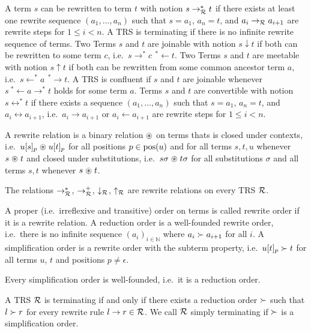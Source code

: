 \begin{definition}
	A term $s$ can be rewritten to term $t$ with notion $s\rightarrow^*_{\mathcal R} t$ 
	if there exists at least one {\myem rewrite sequence} $(a_1,\ldots ,a_n)$ such that
	$s=a_1$, $a_n=t$, and $a_i\rightarrow_{\mathcal R} a_{i+1}$ are rewrite steps for $1\leq i<n$.
	A TRS is {\myem terminating} if there is no infinite rewrite sequence of terms.
	Two Terms $s$ and $t$ are {\myem joinable} with notion $s\downarrow t$ 
	if both can be rewritten to some term $c$, i.e.~$s \rightarrow^*c\ \, ^*\!\!\leftarrow t$.
%	
	Two Terms $s$ and $t$ are {\myem meetable} with notion $s\uparrow t$ 
	if both can be rewritten from some common ancestor term $a$, i.e.~$s \leftarrow^*a\ \, ^*\!\!\rightarrow t$.
%
	A TRS is {\myem confluent } if $s$ and $t$ are joinable whenever $s\ ^*\!\!\leftarrow a \rightarrow^* t$ holds for some term $a$.
	Terms $s$ and $t$ are {\myem convertible} with notion $s\leftrightarrow^* t$ 
	if there exists a sequence $(a_1,\ldots ,a_n)$ such that
	$s=a_1$, $a_n=t$, and $a_i\leftrightarrow a_{i+1}$, i.e.~$a_i\rightarrow a_{i+1}$ or $a_i\leftarrow a_{i+1}$ are rewrite steps for $1\leq i<n$.
\end{definition}

\begin{definition}\label{def:closed-under}
	A {\myem rewrite relation} is a binary relation $\mathrel{\circledast}$ on terms thats is {\myem closed under contexts},
	i.e.~$u[s]_p\mathrel{\circledast} u[t]_p$ %
	for all positions $p\in\operatorname{pos}(u)$ and
	for all terms $s,t,u$ whenever $s\mathrel{\circledast} t$
	and {\myem closed under substitutions}, 
	i.e.~$s\sigma\mathrel{\circledast} t\sigma$ %
	for all substitutions $\sigma$
	and all terms $s,t$ whenever $s\mathrel{\circledast} t$.
\end{definition}
\begin{lemma}
	The relations $\rightarrow^*_{\mathcal R}$, 
	$\rightarrow^+_{\mathcal R}$,
	$\downarrow_{\mathcal R}$, $\uparrow_{\mathcal R}$ are rewrite relations on every TRS ${\mathcal R}$.
\end{lemma}
%
\begin{definition}
	A proper (i.e.~irreflexive and transitive) order on terms is called {\myem rewrite order} if it is a rewrite relation.
	A {\myem reduction order} is a well-founded rewrite order,
	i.e.~there is no infinite sequence 
	$(a_i)_{i\in\mathbb{N}}$
	where $a_i\succ a_{i+1}$ for all $i$.
	A {\myem simplification order} is a rewrite order with the {\myem subterm property},
	i.e.~$u[t]_p \succ t$ for all terms $u$, $t$ and positions $p\neq\epsilon$.
\end{definition}
\begin{lemma}
	Every simplification order is well-founded, i.e.~it is a reduction order.
\end{lemma}
%
\begin{theorem}
	A TRS ${\mathcal R}$ is terminating if and only if there exists a reduction order $\succ$
	such that $l\succ r$ for every rewrite rule $l\rightarrow r\in{\mathcal R}$.
	We call ${\mathcal R}$ simply terminating if $\succ$ is a simplification order.
\end{theorem}

